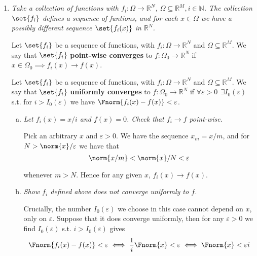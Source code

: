 \documentclass{article}
\begin{document}
\displayoptions

\section{}

\begin{enumerate}[1.]
  \item {\itshape
    Take a collection of functions with $f_i: \Omega \to \mathbb{R}^N$, $\Omega \subseteq \mathbb{R}^M, i \in \mathbb{N}$. The collection $\set{f_i}$ defines a sequence of funtions, and for each $x \in \Omega$ we have a possibly different sequence $\set{f_i(x)}$ in $\mathbb{R}^N$.

    Let $\set{f_i}$ be a sequence of functions, with $f_i: \Omega \to \mathbb{R}^N$ and $\Omega \subseteq \mathbb{R}^M$. We say that $\set{f_i}$ \textbf{point-wise converges} to $f: \Omega_0 \to \mathbb{R}^N$ if $x \in \Omega_0 \implies f_i(x) \to f(x)$.

    Let $\set{f_i}$ be a sequence of functions, with $f_i: \Omega \to \mathbb{R}^N$ and $\Omega \subseteq \mathbb{R}^M$. We say that $\set{f_i}$ \textbf{uniformly converges} to $f: \Omega_0 \to \mathbb{R}^N$ if $\forall \varepsilon > 0 ~~ \exists I_0(\varepsilon)$ s.t. for $i > I_0(\varepsilon)$ we have $\Fnorm{f_i(x) - f(x)} < \varepsilon$. }

    \begin{enumerate}[a)]
      \item \textit{Let $f_i(x) = x / i$ and $f(x) = 0$. Check that $f_i \to f$ point-wise.}

        \solution Pick an arbitrary $x$ and $\varepsilon > 0$. We have the sequence $x_m = x / m$, and for $N > \norm{x} / \varepsilon$ we have that
        \[
          \norm{x / m} < \norm{x} / N < \varepsilon
        \]

        whenever $m > N$. Hence for any given $x$, $f_i(x) \to f(x)$.

      \item \textit{Show $f_i$ defined above does not converge uniformly to $f$.}

        \solution Crucially, the number $I_0(\varepsilon)$ we choose in this case cannot depend on $x$, only on $\varepsilon$. Suppose that it does converge uniformly, then for any $\varepsilon > 0$ we find $I_0(\varepsilon)$ s.t. $i > I_0(\varepsilon)$ gives
        \[
          \Fnorm{f_i(x) - f(x)} < \varepsilon
          \iff
          \dfrac{1}{i} \Fnorm{x} < \varepsilon
          \iff
          \Fnorm{x} < \varepsilon i
        \]


\end{enumerate}
\end{enumerate}
\end{document}
